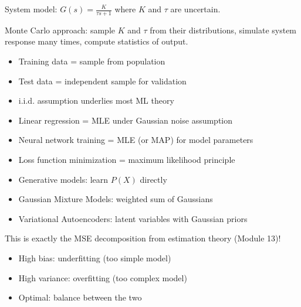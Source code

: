 
System model: $G(s) = \frac{K}{\tau s + 1}$ where $K$ and $\tau$ are uncertain.

Monte Carlo approach: sample $K$ and $\tau$ from their distributions, simulate system response many times, compute statistics of output.



\begin{itemize}
\tightlist
\item
  Training data = sample from population
\item
  Test data = independent sample for validation
\item
  i.i.d. assumption underlies most ML theory
\end{itemize}


\begin{itemize}
\tightlist
\item
  Linear regression = MLE under Gaussian noise assumption
\item
  Neural network training = MLE (or MAP) for model parameters
\item
  Loss function minimization = maximum likelihood principle
\end{itemize}


\begin{itemize}
\tightlist
\item
  Generative models: learn $P(X)$ directly
\item
  Gaussian Mixture Models: weighted sum of Gaussians
\item
  Variational Autoencoders: latent variables with Gaussian priors
\end{itemize}



This is exactly the MSE decomposition from estimation theory (Module 13)!

\begin{itemize}
\tightlist
\item
  High bias: underfitting (too simple model)
\item
  High variance: overfitting (too complex model)
\item
  Optimal: balance between the two
\end{itemize}

